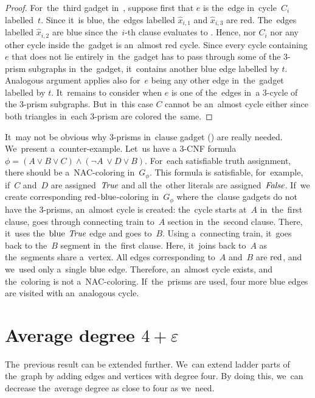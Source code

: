 \begin{proof}
	For~the~third gadget in~,
	suppose first that $e$ is the~edge in~cycle~$C_i$ labelled~$t$.
	Since it~is blue, the~edges labelled $\hat{x}_{i,1}$ and $\hat{x}_{i,3}$ are red.
	The~edges labelled $\hat{x}_{i,2}$ are blue since the~$i$-th clause evaluates to \true{}.
	Hence, nor $C_i$ nor any other cycle inside the~gadget is an~almost red cycle.
	Since every cycle containing $e$ that does not lie entirely in~the~gadget
	has to pass through some of the 3-prism subgraphs in~the~gadget, it~contains another blue edge labelled by $t$.
	Analogous argument applies also for~$e$ being any other edge in~the~gadget labelled by $t$.
	It~remains to consider when $e$ is one of the~edges in~a 3-cycle of the 3-prism subgraphs.
	But in~this case $C$ cannot be an~almost cycle either since both triangles in~each 3-prism are colored the~same.
\end{proof}

It~may not be obvious why 3-prisms in~clause gadget
()
are really needed. We~present a~counter-example.
Let~us have a 3-CNF formula~\( \phi = (A \lor B \lor C) \land (\lnot A~\lor D \lor B) \).
For~each satisfiable truth assignment, there should be a~NAC-coloring in~\( G_\phi \).
%
This formula is satisfiable, for~example, if~\( C \) and~\( D \) are assigned~\( \textit{True} \)
and all the~other literals are assigned~\( \textit{False} \).
If~we create corresponding \( \text{red} \)-\( \text{blue} \)-coloring in~\( G_\phi \)
where the~clause gadgets do not have the 3-prisms, an~almost cycle is created:
%
the~cycle starts at~\( A \) in~the~first clause, goes through connecting
train to~\( A \) section in~the~second clause. There, it~uses the~\( \text{blue} \)
\( \textit{True} \) edge and goes to~\( B \). Using a~connecting train,
it~goes back to the~\( B \) segment in~the~first clause.
Here, it~joins back to~\( A \) as the~segments share a~vertex.
All edges corresponding to~\( A \) and~\( B \)
are \( \text{red} \), and we~used only a~single \( \text{blue} \) edge.
Therefore, an~almost cycle exists, and the~coloring is not a~NAC-coloring.
If~the~prisms are used, four more blue edges are visited with an~analogous cycle.


\section{Average degree \( 4 + \varepsilon \)}

The~previous result can be extended further.
We~can extend ladder parts of the~graph by adding
edges and vertices with degree four.
By doing this, we~can decrease the~average degree as close to four as we~need.

